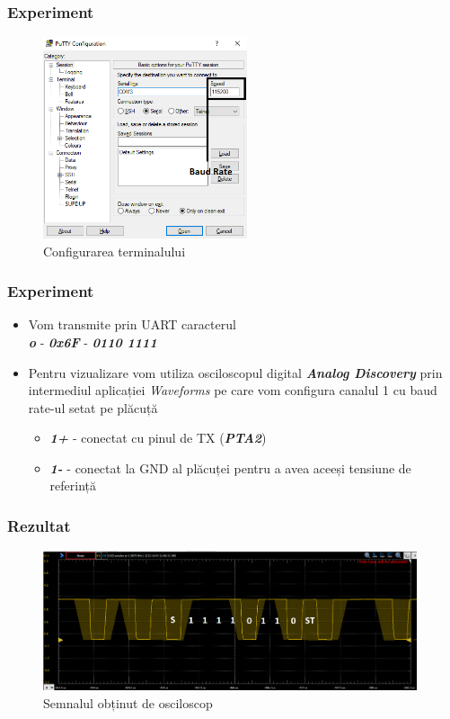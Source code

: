 \documentclass[xcolor={table}]{beamer}
\begin{document}
        \begin{frame}
                \frametitle{Experiment}
                \begin{figure}
                    \centering
                    \includegraphics[width=6cm]{images/putty1.png}
                    \caption{Configurarea terminalului}
                \end{figure}
        \end{frame}
        \begin{frame}
                \frametitle{Experiment}
                \begin{itemize}
                    \item Vom transmite prin UART caracterul \\ 
                    \textbf{\textit{o}} - \textbf{\textit{0x6F}} - \textit{\textbf{0110 1111}}
                    \item Pentru vizualizare vom utiliza osciloscopul digital \textbf{\textit{Analog Discovery}} prin intermediul aplicației \textit{Waveforms} pe care vom configura canalul 1 cu baud rate-ul setat pe plăcuță
                    \begin{itemize}
                        \item \textbf{\textit{1+}} - conectat cu pinul de TX (\textbf{\textit{PTA2}})
                        \item \textbf{\textit{1-}} - conectat la GND al plăcuței pentru a avea aceeși tensiune de referință
                    \end{itemize}
                \end{itemize}
        \end{frame}
        \begin{frame}
                \frametitle{Rezultat}
                \begin{figure}
                    \centering
                    \includegraphics[width=11cm]{images/osciloscop.png}
                    \caption{Semnalul obținut de osciloscop}
                    \label{fig:my_label}
                \end{figure}
        \end{frame}
	\appendix
\end{document}
